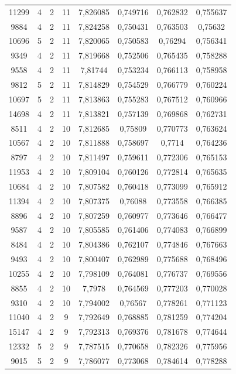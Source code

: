 \begin{longtable}{|c|c|c|c|c|c|c|c|}
11299 & 4 & 2 & 11 & 7,826085 & 0,749716 & 0,762832 & 0,755637 \\
9884 & 4 & 2 & 11 & 7,824258 & 0,750431 & 0,763503 & 0,75632 \\
10696 & 5 & 2 & 11 & 7,820065 & 0,750583 & 0,76294 & 0,756341 \\
9349 & 4 & 2 & 11 & 7,819668 & 0,752506 & 0,765435 & 0,758288 \\
9558 & 4 & 2 & 11 & 7,81744 & 0,753234 & 0,766113 & 0,758958 \\
9812 & 5 & 2 & 11 & 7,814829 & 0,754529 & 0,766779 & 0,760224 \\
10697 & 5 & 2 & 11 & 7,813863 & 0,755283 & 0,767512 & 0,760966 \\
14698 & 4 & 2 & 11 & 7,813821 & 0,757139 & 0,769868 & 0,762731 \\
8511 & 4 & 2 & 10 & 7,812685 & 0,75809 & 0,770773 & 0,763624 \\
10567 & 4 & 2 & 10 & 7,811888 & 0,758697 & 0,7714 & 0,764236 \\
8797 & 4 & 2 & 10 & 7,811497 & 0,759611 & 0,772306 & 0,765153 \\
11953 & 4 & 2 & 10 & 7,809104 & 0,760126 & 0,772814 & 0,765635 \\
10684 & 4 & 2 & 10 & 7,807582 & 0,760418 & 0,773099 & 0,765912 \\
11394 & 4 & 2 & 10 & 7,807375 & 0,76088 & 0,773558 & 0,766385 \\
8896 & 4 & 2 & 10 & 7,807259 & 0,760977 & 0,773646 & 0,766477 \\
9587 & 4 & 2 & 10 & 7,805585 & 0,761406 & 0,774083 & 0,766899 \\
8484 & 4 & 2 & 10 & 7,804386 & 0,762107 & 0,774846 & 0,767663 \\
9493 & 4 & 2 & 10 & 7,800407 & 0,762989 & 0,775688 & 0,768496 \\
10255 & 4 & 2 & 10 & 7,798109 & 0,764081 & 0,776737 & 0,769556 \\
8855 & 4 & 2 & 10 & 7,7978 & 0,764569 & 0,777203 & 0,770028 \\
9310 & 4 & 2 & 10 & 7,794002 & 0,76567 & 0,778261 & 0,771123 \\
11040 & 4 & 2 & 9 & 7,792649 & 0,768885 & 0,781259 & 0,774204 \\
15147 & 4 & 2 & 9 & 7,792313 & 0,769376 & 0,781678 & 0,774644 \\
12332 & 5 & 2 & 9 & 7,787515 & 0,770658 & 0,782326 & 0,775956 \\
9015 & 5 & 2 & 9 & 7,786077 & 0,773068 & 0,784614 & 0,778288 \\

\end{longtable}
